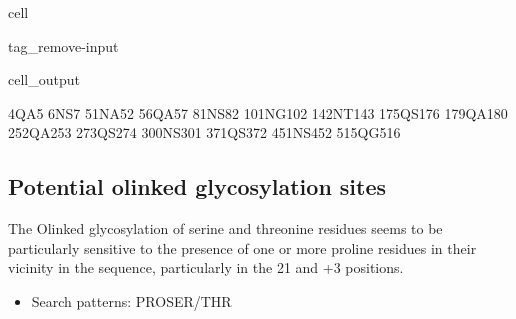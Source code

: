 \documentclass[letterpaper,10pt,english]{jupyterBook}
\begin{document}
\begin{sphinxuseclass}{cell}
\begin{sphinxuseclass}{tag_remove-input}\begin{sphinxVerbatimOutput}

\begin{sphinxuseclass}{cell_output}
\begin{sphinxVerbatim}[commandchars=\\\{\}]
4\PYGZhy{}QA\PYGZhy{}5
6\PYGZhy{}NS\PYGZhy{}7
51\PYGZhy{}NA\PYGZhy{}52
56\PYGZhy{}QA\PYGZhy{}57
81\PYGZhy{}NS\PYGZhy{}82
101\PYGZhy{}NG\PYGZhy{}102
142\PYGZhy{}NT\PYGZhy{}143
175\PYGZhy{}QS\PYGZhy{}176
179\PYGZhy{}QA\PYGZhy{}180
252\PYGZhy{}QA\PYGZhy{}253
273\PYGZhy{}QS\PYGZhy{}274
300\PYGZhy{}NS\PYGZhy{}301
371\PYGZhy{}QS\PYGZhy{}372
451\PYGZhy{}NS\PYGZhy{}452
515\PYGZhy{}QG\PYGZhy{}516
\end{sphinxVerbatim}

\end{sphinxuseclass}\end{sphinxVerbatimOutput}

\end{sphinxuseclass}
\end{sphinxuseclass}

\subsection{Potential o\sphinxhyphen{}linked glycosylation sites}
\label{\detokenize{ipynb/chapter1:potential-o-linked-glycosylation-sites}}
\sphinxAtStartPar
The O\sphinxhyphen{}linked glycosylation of serine and threonine residues seems to be particularly sensitive to the presence of one or more proline residues in their vicinity in the sequence, particularly in the 2\sphinxhyphen{}1 and +3 positions.
\begin{itemize}
\item {} 
\sphinxAtStartPar
Search patterns: PRO\sphinxhyphen{}SER/THR

\end{itemize}
\end{document}
